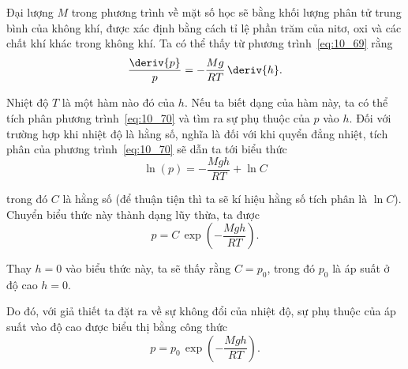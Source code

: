\noindent

Đại lượng $M$ trong phương trình về mặt số học sẽ bằng khối lượng phân tử trung bình của không khí, được xác định bằng cách tỉ lệ phần trăm của nitơ, oxi và các chất khí khác trong không khí. Ta có thể thấy từ phương trình~\eqref{eq:10_69} rằng 
\begin{equation}\label{eq:10_70}
	\frac{\deriv{p}}{p} = -\frac{Mg}{RT}\,\deriv{h}.
\end{equation}

\noindent

Nhiệt độ $T$ là một hàm nào đó của $h$. Nếu ta biết dạng của hàm này, ta có thể tích phân phương trình~\eqref{eq:10_70} và tìm ra sự phụ thuộc của $p$ vào $h$. Đối với trường hợp khi nhiệt độ là hằng số, nghĩa là đối với khi quyển đẳng nhiệt, tích phân của phương trình~\eqref{eq:10_70} sẽ dẫn ta tới biểu thức    
\begin{equation*}
	\ln({p}) = -\frac{Mgh}{RT} + \ln{C}
\end{equation*}

\noindent

trong đó $C$ là hằng số (để thuận tiện thì ta sẽ kí hiệu hằng số tích phân là $\ln{C}$). Chuyển biểu thức này thành dạng lũy thừa, ta được 
\begin{equation*}
	p = C\,\exp\left(- \frac{Mgh}{RT} \right).
\end{equation*}

\noindent

Thay $h=0$ vào biểu thức này, ta sẽ thấy rằng $C=p_0$, trong đó $p_0$ là áp suất ở độ cao $h=0$.    


Do đó, với giả thiết ta đặt ra về sự không đổi của nhiệt độ, sự phụ thuộc của áp suất vào độ cao được biểu thị bằng công thức
\begin{equation}\label{eq:10_71}
	p = p_0\,\exp\left(- \frac{Mgh}{RT} \right).
\end{equation}

